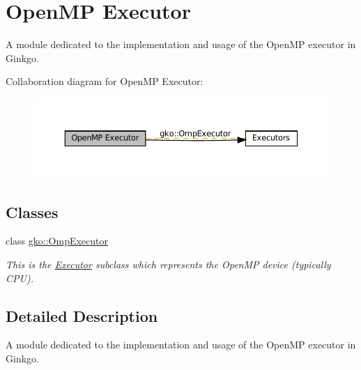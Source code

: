 \hypertarget{group__exec__omp}{}\section{Open\+MP Executor}
\label{group__exec__omp}


A module dedicated to the implementation and usage of the Open\+MP executor in Ginkgo.  


Collaboration diagram for Open\+MP Executor\+:
\nopagebreak
\begin{figure}[H]
\begin{center}
\leavevmode
\includegraphics[width=350pt]{group__exec__omp}
\end{center}
\end{figure}
\subsection*{Classes}
\begin{DoxyCompactItemize}
\item 
class \hyperlink{classgko_1_1OmpExecutor}{gko\+::\+Omp\+Executor}
\begin{DoxyCompactList}\small\item\em This is the \hyperlink{classgko_1_1Executor}{Executor} subclass which represents the Open\+MP device (typically C\+PU). \end{DoxyCompactList}\end{DoxyCompactItemize}


\subsection{Detailed Description}
A module dedicated to the implementation and usage of the Open\+MP executor in Ginkgo. 


